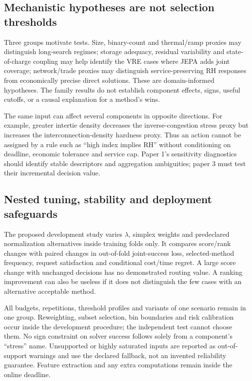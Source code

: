 \subsection{Mechanistic hypotheses are not selection thresholds}
Three groups motivate tests. Size, binary-count and thermal/ramp proxies
may distinguish long-search regimes; storage adequacy, residual variability
and state-of-charge coupling may help identify the VRE cases where JEPA
adds joint coverage; network/trade proxies may distinguish service-preserving
RH responses from economically precise direct solutions. These are
domain-informed hypotheses. The family results do not establish component
effects, signs, useful cutoffs, or a causal explanation for a method's wins.

The same input can affect several components in opposite directions.
For example, greater intertie density decreases the inverse-congestion
stress proxy but increases the interconnection-density hardness proxy.
Thus an action cannot be assigned by a rule such as ``high index implies RH''
without conditioning on deadline, economic tolerance and service cap.
Paper 1's sensitivity diagnostics should identify stable descriptors and
aggregation ambiguities; paper 3 must test their incremental decision value.

\subsection{Nested tuning, stability and deployment safeguards}
The proposed development study varies $\lambda$, simplex weights and
predeclared normalization alternatives inside training folds only. It
compares score/rank changes with paired changes in out-of-fold joint-success
loss, selected-method frequency, request satisfaction and conditional
cost/time regret. A large score change with unchanged decisions has no
demonstrated routing value. A ranking improvement can also be useless if
it does not distinguish the few cases with an alternative acceptable method.

All budgets, repetitions, threshold profiles and variants of one scenario
remain in one group. Reweighting, subset selection, bin boundaries and risk
calibration occur inside the development procedure; the independent test
cannot choose them. No sign constraint on solver success follows solely
from a component's ``stress'' name. Unsupported or highly saturated inputs
are reported as out-of-support warnings and use the declared fallback,
not an invented reliability guarantee. Feature extraction and any extra
computations remain inside the online deadline.

